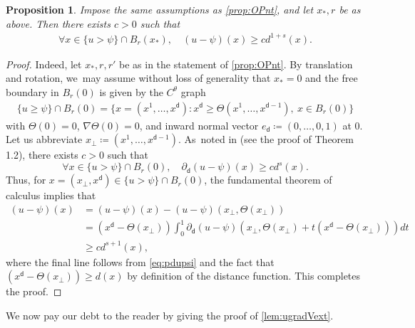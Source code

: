 \documentclass[10pt]{amsart}
\theoremstyle{plain}
\newtheorem{prop}[thm]{Proposition}
\theoremstyle{definition}
\let\nab\nabla
\let\p\partial
\renewcommand{\d}{\mathsf{d}}
\begin{document}
\begin{prop}\label{prop:OPreglb}
Impose the same assumptions as \cref{prop:OPnt}, and let $x_*,r$ be as above. Then there exists $c>0$ such that
\begin{align*}
\forall x\in \{u>\psi\} \cap B_{r}(x_*), \quad (u-\psi)(x) \ge cd^{1+s}(x).
\end{align*}
\end{prop}
\begin{proof}
Indeed, let $x_*,r,r'$ be as in the statement of \cref{prop:OPnt}. By translation and rotation, we~may assume without loss of generality that $x_* = 0$ and the free boundary in $B_r(0)$ is given by the $C^\theta$ graph
\begin{align*}
\{u\ge \psi\} \cap B_{r}(0) = \bigl\{x = (x^1,\ldots,x^\d) : x^\d \ge \Theta(x^1,\ldots,x^{\d-1}) , \ x\in B_r(0)\bigr\}
\end{align*}
with $\Theta(0) =0$, $\nab\Theta(0)=0$, and inward normal vector $e_\d \coloneqq (0,\ldots,0,1)$ at $0$. Let us abbreviate $x_\perp \coloneqq (x^1,\ldots,x^{\d-1})$. As~noted in \cite{ArO2020} (see the proof of Theorem 1.2), there exists $c>0$ such that
\begin{equation}\label{eq:pdupsi}
\forall x\in \{u>\psi\} \cap B_r(0),\quad\p_\d(u-\psi)(x) \ge c d^s(x).
\end{equation}
Thus, for $x=(x_\perp, x^\d) \in \{u>\psi\} \cap B_r(0)$, the fundamental theorem of calculus implies that
\begin{align*}
(u-\psi)(x) &= (u-\psi)(x)- (u-\psi)(x_\perp, \Theta(x_\perp))\\
& = (x^\d - \Theta(x_\perp))\int_0^1 \p_{\d}(u-\psi)(x_\perp, \Theta(x_\perp) + t(x^{\d}-\Theta(x_\perp))) dt\\
&\ge cd^{s+1}(x),
\end{align*}
where the final line follows from \eqref{eq:pdupsi} and the fact that $(x^\d - \Theta(x_\perp)) \ge d(x)$ by definition of the distance function. This completes the proof.
\end{proof}

We now pay our debt to the reader by giving the proof of \cref{lem:ugradVext}.
\end{document}
